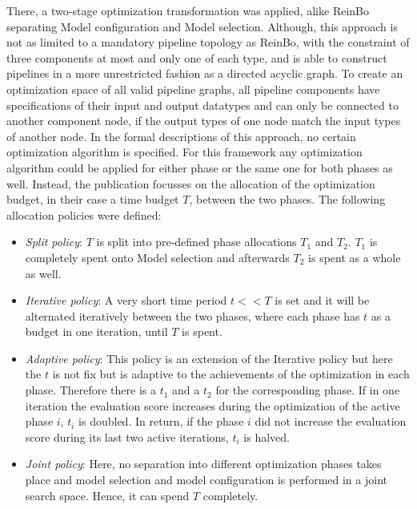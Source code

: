 There, a two-stage optimization transformation was applied, alike ReinBo separating Model configuration and Model selection.
Although, this approach is not as limited to a mandatory pipeline topology as ReinBo, with the constraint of three components at most and only one of each type, and is able to construct pipelines in a more unrestricted fashion as a directed acyclic graph.
To create an optimization space of all valid pipeline graphs, all pipeline components have specifications of their input and output datatypes and can only be connected to another component node, if the output types of one node match the input types of another node.\newline
In the formal descriptions of this approach, no certain optimization algorithm is specified.
For this framework any optimization algorithm could be applied for either phase or the same one for both phases as well.
Instead, the publication focusses on the allocation of the optimization budget, in their case a time budget $T$, between the two phases.
The following allocation policies were defined:
\begin{itemize}
    \item \textit{Split policy}: $T$ is split into pre-defined phase allocations $T_1$ and $T_2$. $T_1$ is completely spent onto Model selection and afterwards $T_2$ is spent as a whole as well.
    \item \textit{Iterative policy}: A very short time period $t << T$ is set and it will be alternated iteratively between the two phases, where each phase has $t$ as a budget in one iteration, until $T$ is spent.
    \item \textit{Adaptive policy}: This policy is an extension of the Iterative policy but here the $t$ is not fix but is adaptive to the achievements of the optimization in each phase.
    Therefore there is a $t_1$ and a $t_2$ for the corresponding phase.
    If in one iteration the evaluation score increases during the optimization of the active phase $i$, $t_i$ is doubled.
    In return, if the phase $i$ did not increase the evaluation score during its last two active iterations, $t_i$ is halved.
    \item \textit{Joint policy}: Here, no separation into different optimization phases takes place and model selection and model configuration is performed in a joint search space.
    Hence, it can spend $T$ completely.
\end{itemize}
